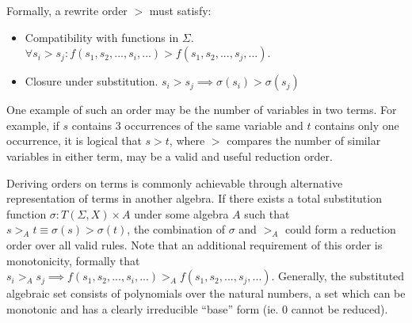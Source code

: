 \documentclass{article}
\begin{document}
Formally, a rewrite order $>$ must satisfy:
\begin{itemize}
    \item Compatibility with functions in $\Sigma$. $\forall s_i > s_j: f(s_1, s_2, ..., s_i, ...) > f(s_1, s_2, ..., s_j, ...)$.
    \item Closure under substitution. $ s_i > s_j \implies \sigma(s_i) > \sigma(s_j)$
\end{itemize}
One example of such an order may be the number of variables in two terms.
For example, if $s$ contains 3 occurrences of the same variable and $t$ contains only one occurrence,
it is logical that $s > t$, where $>$ compares the number of similar variables in either term, may be a valid and useful reduction order.

Deriving orders on terms is commonly achievable through alternative representation of terms in another algebra.
If there exists a total substitution function $\sigma: T(\Sigma,X) \times A$ under some algebra $A$ such that $s >_A t \equiv \sigma(s) > \sigma(t)$,
the combination of $\sigma$ and $>_A$ could form a reduction order over all valid rules. Note that an additional requirement of this order is monotonicity, formally
that $s_i >_A s_j \implies f(s_1, s_2, ..., s_i, ...) >_A f(s_1, s_2, ..., s_j, ...)$. Generally, the substituted algebraic set consists of polynomials over the natural numbers,
a set which can be monotonic and has a clearly irreducible ``base'' form (ie. 0 cannot be reduced).
\end{document}
